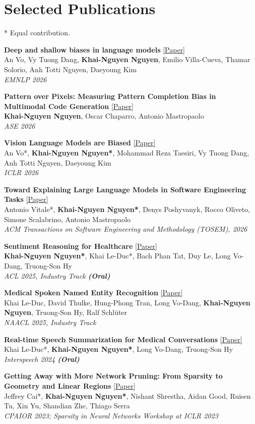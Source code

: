 \documentclass[11pt,a4paper]{article}
\newcommand{\pub}[5][]{%
  \if\relax\detokenize{#1}\relax
    \item
  \else
    \item[#1]
  \fi
  \begin{minipage}[t]{\linewidth}
    \textbf{#2} #3\\#4\\\textit{#5}
  \end{minipage}
}
\begin{document}
\section{Selected Publications}
{ * Equal contribution.}
\begin{enumerate}[label={[C\arabic*]},leftmargin=21pt,itemsep=6pt,topsep=4pt,parsep=0pt]
\pub{\label{pub:deepbias}Deep and shallow biases in language models}{\href{https://arxiv.org/abs/2609.09901}{[Paper]}}{An Vo, Vy Tuong Dang, \textbf{Khai-Nguyen Nguyen}, Emilio Villa-Cueva, Thamar Solorio, Anh Totti Nguyen, Daeyoung Kim}{EMNLP 2026}
\pub{\label{pub:pvp}Pattern over Pixels: Measuring Pattern Completion Bias in Multimodal Code Generation}{\href{https://arxiv.org/abs/2608.03691}{[Paper]}}{\textbf{Khai-Nguyen Nguyen}, Oscar Chaparro, Antonio Mastropaolo}{ASE 2026}
\pub{\label{pub:vlmbias}Vision Language Models are Biased}{\href{https://arxiv.org/abs/2505.23941}{[Paper]}}{An Vo*, \textbf{Khai-Nguyen Nguyen*}, Mohammad Reza Taesiri, Vy Tuong Dang, Anh Totti Nguyen, Daeyoung Kim}{ICLR 2026}
\pub{\label{pub:featureshap}Toward Explaining Large Language Models in Software Engineering Tasks}{\href{https://doi.org/10.1145/3837084}{[Paper]}}{Antonio Vitale*, \textbf{Khai-Nguyen Nguyen*}, Denys Poshyvanyk, Rocco Oliveto, Simone Scalabrino, Antonio Mastropaolo}{ACM Transactions on Software Engineering and Methodology (TOSEM), 2026}
\pub{\label{pub:sentrea}Sentiment Reasoning for Healthcare}{\href{https://arxiv.org/abs/2407.21054}{[Paper]}}{\textbf{Khai-Nguyen Nguyen*}, Khai Le-Duc*, Bach Phan Tat, Duy Le, Long Vo-Dang, Truong-Son Hy}{ACL 2025, Industry Track \textbf{(Oral)}}
\pub{\label{pub:medspoke}Medical Spoken Named Entity Recognition}{\href{https://arxiv.org/abs/2406.13337}{[Paper]}}{Khai Le-Duc, David Thulke, Hung-Phong Tran, Long Vo-Dang, \textbf{Khai-Nguyen Nguyen}, Truong-Son Hy, Ralf Schl\"uter}{NAACL 2025, Industry Track}
\pub{\label{pub:realspeech}Real-time Speech Summarization for Medical Conversations}{\href{https://arxiv.org/abs/2406.15888}{[Paper]}}{Khai Le-Duc*, \textbf{Khai-Nguyen Nguyen*}, Long Vo-Dang, Truong-Son Hy}{Interspeech 2024 \textbf{(Oral)}}
\pub{\label{pub:gettingaway}Getting Away with More Network Pruning: From Sparsity to Geometry and Linear Regions}{\href{https://arxiv.org/abs/2301.07966}{[Paper]}}{Jeffrey Cai*, \textbf{Khai-Nguyen Nguyen*}, Nishant Shrestha, Aidan Good, Ruisen Tu, Xin Yu, Shandian Zhe, Thiago Serra}{CPAIOR 2023; Sparsity in Neural Networks Workshop at ICLR 2023}
\end{enumerate}
\end{document}
